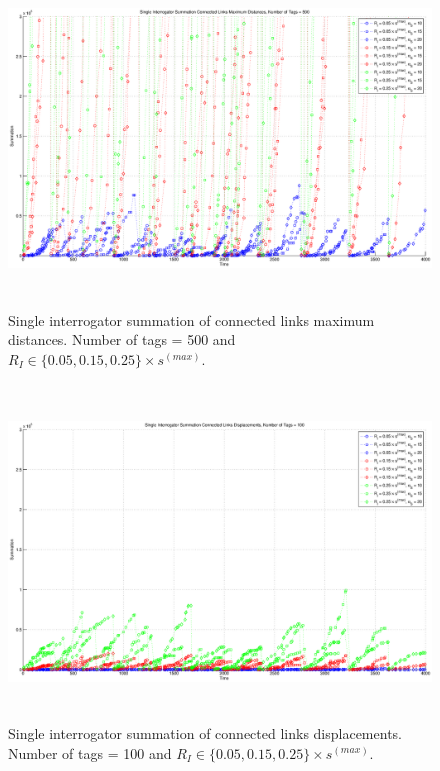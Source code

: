 \begin{figure}
\centering
\includegraphics[width=5in, height=3.5in]{Chapter_4_Figures/sin_max_500tags_all.eps}
\caption{Single interrogator summation of connected links maximum distances. Number of tags = 500 and $R_I \in \{0.05, 0.15, 0.25\} \times s^{(max)}$.}
\label{Figure: sin_max_500tags_all.eps}
\end{figure}
\begin{figure}
\centering
\includegraphics[width=5in, height=3.5in]{Chapter_4_Figures/sin_disp_100tags_all.eps}
\caption{Single interrogator summation of connected links displacements. Number of tags = 100 and $R_I \in \{0.05, 0.15, 0.25\} \times s^{(max)}$.}
\label{Figure: sin_disp_100tags_all.eps}
\end{figure}
\clearpage

